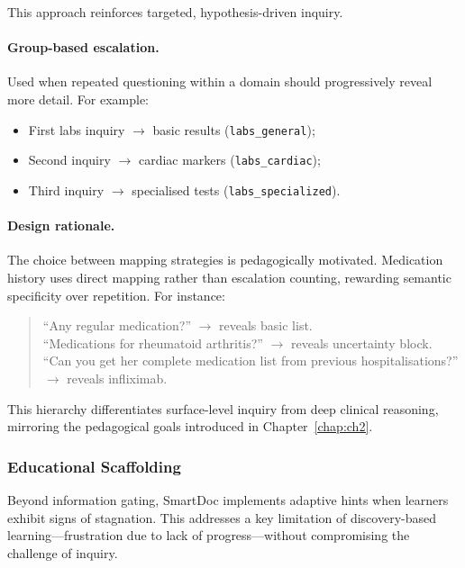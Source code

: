 This approach reinforces targeted, hypothesis-driven inquiry.

\paragraph{Group-based escalation.}
Used when repeated questioning within a domain should progressively reveal more
detail.  
For example:

\begin{itemize}
  \item First labs inquiry $\rightarrow$ basic results (\texttt{labs\_general});
  \item Second inquiry $\rightarrow$ cardiac markers (\texttt{labs\_cardiac});
  \item Third inquiry $\rightarrow$ specialised tests (\texttt{labs\_specialized}).
\end{itemize}

\paragraph{Design rationale.}
The choice between mapping strategies is pedagogically motivated.
Medication history uses direct mapping rather than escalation counting,
rewarding semantic specificity over repetition.
For instance:

\begin{quote}
``Any regular medication?'' $\rightarrow$ reveals basic list.\\
``Medications for rheumatoid arthritis?'' $\rightarrow$ reveals uncertainty block.\\
``Can you get her complete medication list from previous hospitalisations?'' $\rightarrow$ reveals infliximab.
\end{quote}

This hierarchy differentiates surface-level inquiry from deep clinical reasoning,
mirroring the pedagogical goals introduced in Chapter~\ref{chap:ch2}.

\subsubsection{Educational Scaffolding}

Beyond information gating, SmartDoc implements adaptive hints when learners exhibit
signs of stagnation.  
This addresses a key limitation of discovery-based learning—frustration due to lack of
progress—without compromising the challenge of inquiry.

